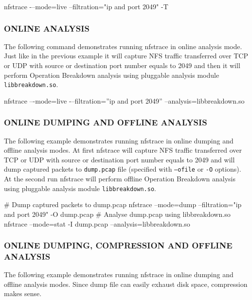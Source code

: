 \documentclass{article}
\newcommand*{\textfile}[1]{\textsf{#1}}
\newcommand*{\textprog}[1]{\textfile{#1}}
\newcommand{\code}[1]{\texttt{#1}}
\begin{document}
\begin{CodeListing} 
nfstrace -–mode=live --filtration="ip and port 2049" -T 
\end{CodeListing}

\subsubsection{ONLINE ANALYSIS}

The following command demonstrates running \textprog{nfstrace} in online analysis mode.
Just like in the previous example it will capture \gls{NFS} traffic transferred
over TCP or UDP with source or destination port number equals to 2049 and then
it will perform Operation Breakdown analysis using pluggable analysis module
\code{libbreakdown.so}.
\begin{CodeListing}
nfstrace –-mode=live -–filtration=”ip and port 2049” --analysis=libbreakdown.so
\end{CodeListing}

\subsubsection{ONLINE DUMPING AND OFFLINE ANALYSIS}

The following example demonstrates running \textprog{nfstrace} in online
dumping and offline analysis modes.  At first \textprog{nfstrace} will capture
\gls{NFS} traffic transferred over TCP or UDP with source or destination port
number equals to 2049 and will dump captured packets to \code{dump.pcap} file
(specified with \code{--ofile} or \code{-O} options).  At the second run
\textprog{nfstrace} will perform offline Operation Breakdown analysis using
pluggable analysis module \code{libbreakdown.so}.  \begin{CodeListing}
\# Dump captured packets to dump.pcap 
nfstrace --mode=dump
         --filtration="ip and port 2049"
         -O dump.pcap 
\# Analyse dump.pcap using libbreakdown.so 
nfstrace --mode=stat
         -I dump.pcap
         --analysis=libbreakdown.so
\end{CodeListing}

\subsubsection{ONLINE DUMPING, COMPRESSION AND OFFLINE ANALYSIS}

The following example demonstrates running \textprog{nfstrace} in online dumping and
offline analysis modes. Since dump file can easily exhaust disk space,
compression makes sense.
\end{document}
